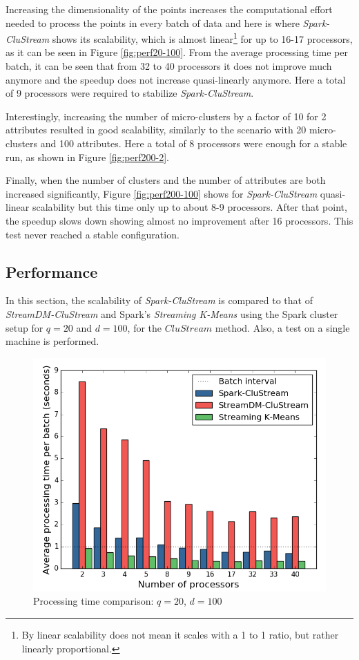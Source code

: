 \addtocounter{figure}{-1}
Increasing the dimensionality of the points increases the computational effort needed to process the points in every batch of data and here is where \textit{Spark-CluStream} shows its scalability, which is almost linear\footnote{By linear scalability does not mean it scales with a 1 to 1 ratio, but rather linearly proportional.} for up to 16-17 processors, as it can be seen in Figure \ref{fig:perf20-100}.  From the average processing time per batch, it can be seen that from 32 to 40 processors it does not improve much anymore and the speedup does not increase quasi-linearly anymore. Here a total of 9 processors were required to stabilize \textit{Spark-CluStream}. 


Interestingly, increasing the number of micro-clusters by a factor of 10 for 2 attributes resulted in good scalability, similarly to the scenario with 20 micro-clusters and 100 attributes. Here a total of 8 processors were enough for a stable run, as shown in Figure \ref{fig:perf200-2}.



Finally, when the number of clusters and the number of attributes are both increased significantly, Figure \ref{fig:perf200-100} shows for \textit{Spark-CluStream} quasi-linear scalability but this time only up to about 8-9 processors. After that point, the speedup slows down showing almost no improvement after 16 processors. This test never reached a stable configuration.


\subsection{Performance}

In this section, the scalability of \textit{Spark-CluStream} is compared to that of \textit{StreamDM-CluStream} and Spark's \textit{Streaming K-Means} using the Spark cluster setup for $q=20$ and $d=100$, for the $CluStream$ method. Also, a test on a single machine is performed.


\begin{figure}[h!]
 \centering
 \includegraphics[scale=0.45]{./styles/perfComp100.png}
 \caption{Processing time comparison: $q=20$, $d=100$}
 \label{fig:perfComp100}
\end{figure}

